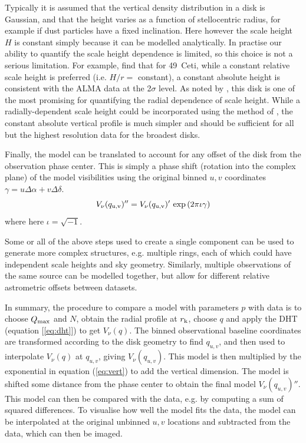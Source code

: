 \documentclass[fleqn,usenatbib]{mnras}
\begin{document}
Typically it is assumed that the vertical density distribution in a disk is Gaussian, and that the height varies as a function of stellocentric radius, for example if dust particles have a fixed inclination. Here however the scale height $H$ is constant simply because it can be modelled analytically. In practise our ability to quantify the scale height dependence is limited, so this choice is not a serious limitation. For example, \citet{2023MNRAS.524.1229T} find that for 49~Ceti, while a constant relative scale height is preferred (i.e. $H/r=$ constant), a constant absolute height is consistent with the ALMA data at the 2$\sigma$ level. As noted by \citet{2023MNRAS.524.1229T}, this disk is one of the most promising for quantifying the radial dependence of scale height. While a radially-dependent scale height could be incorporated using the method of \citet{2023MNRAS.524.1229T}, the constant absolute vertical profile is much simpler and should be sufficient for all but the highest resolution data for the broadest disks.

Finally, the model can be translated to account for any offset of the disk from the observation phase center. This is simply a phase shift (rotation into the complex plane) of the model visibilities using the original binned $u,v$ coordinates $\gamma = u \Delta \alpha + v \Delta \delta$.
\begin{equation}\label{eq:phase}
    V_\nu(q_{\rm u,v})'' = V_\nu(q_{\rm u,v})' \, \exp{(2 \pi \iota \gamma)}
\end{equation}
where here $\iota = \sqrt{-1}$.

Some or all of the above steps used to create a single component can be used to generate more complex structures, e.g. multiple rings, each of which could have independent scale heights and sky geometry. Similarly, multiple observations of the same source can be modelled together, but allow for different relative astrometric offsets between datasets.

In summary, the procedure to compare a model with parameters $p$ with data is to choose $Q_{\rm max}$ and $N$, obtain the radial profile at $r_{\rm k}$, choose $q$ and apply the DHT (equation [\ref{eq:dht}]) to get $V_\nu(q)$. The binned observational baseline coordinates are transformed according to the disk geometry to find $q_{u,v}$, and then used to interpolate $V_\nu(q)$ at $q_{u,v}$, giving $V_\nu(q_{u,v})$. This model is then multiplied by the exponential in equation (\ref{eq:vert}) to add the vertical dimension. The model is shifted some distance from the phase center to obtain the final model $V_\nu(q_{u,v})''$. This model can then be compared with the data, e.g. by computing a sum of squared differences. To visualise how well the model fits the data, the model can be interpolated at the original unbinned $u,v$ locations and subtracted from the data, which can then be imaged.
\end{document}
